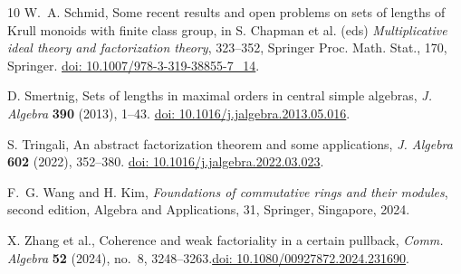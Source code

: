 \documentclass[a4paper, 10pt]{amsart}
\theoremstyle{plain}
\theoremstyle{definition}
\theoremstyle{remark}
\numberwithin{equation}{section}
\begin{document}
\begin{thebibliography}{10}
 W.~A. Schmid, Some recent results and open problems on sets of lengths of Krull monoids with finite class group, in S. Chapman et al. (eds) {\it Multiplicative ideal theory and factorization theory}, 323--352, Springer Proc. Math. Stat., 170, Springer. \href{https://doi.org/10.1007/978-3-319-38855-7_14}{doi: 10.1007/978-3-319-38855-7\_14}.

 D. Smertnig, Sets of lengths in maximal orders in central simple algebras, {\it J. Algebra} {\bf 390} (2013), 1--43. \href{https://doi.org/10.1016/j.jalgebra.2013.05.016}{doi: 10.1016/j.jalgebra.2013.05.016}.

 S. Tringali, An abstract factorization theorem and some applications, {\it J. Algebra} {\bf 602} (2022), 352--380. \href{https://doi.org/10.1016/j.jalgebra.2022.03.023}{doi: 10.1016/j.jalgebra.2022.03.023}.

 F.~G. Wang and H. Kim, {\it Foundations of commutative rings and their modules}, second edition, Algebra and Applications, 31, Springer, Singapore, 2024.

 X. Zhang et al., Coherence and weak factoriality in a certain pullback, {\it Comm. Algebra} {\bf 52} (2024), no.~8, 3248--3263.\href{https://www.tandfonline.com/doi/full/10.1080/00927872.2024.2316901}{doi: 10.1080/00927872.2024.231690}.

\end{thebibliography}
\end{document}
